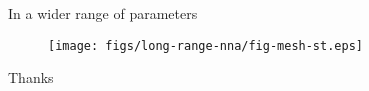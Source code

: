 \documentclass{beamer}
\newcommand{\whitec}[1]{{\color{white} #1}}
\begin{document}
\begin{frame}{In a wider range of parameters}
  \begin{figure}
    \centering
    \texttt{[image: figs/long-range-nna/fig-mesh-st.eps]}
  \end{figure}  
\end{frame}

\begin{frame}{\whitec{Thanks}}
  \begin{figure}
    \centering
  \end{figure}  
\end{frame}
\end{document}
